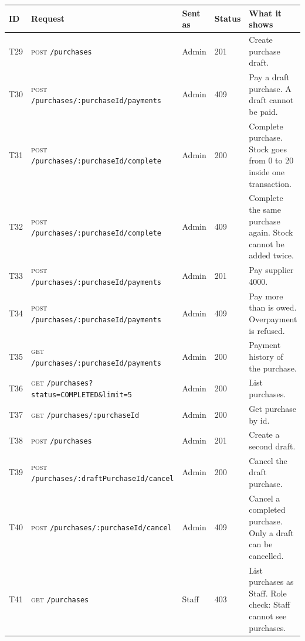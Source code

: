 \documentclass[11pt,a4paper]{article}
\newcommand{\code}[1]{\texttt{#1}}
\begin{document}
\begin{longtable}{@{}P{0.7cm}P{5.0cm}P{1.3cm}P{1.15cm}P{5.75cm}@{}}
\toprule
\textbf{ID} & \textbf{Request} & \textbf{Sent as} & \textbf{Status} & \textbf{What it shows} \\
\midrule
\endhead
T29 & \textsc{post} \code{/\allowbreak{}purchases} & Admin & 201 & Create purchase draft. \\
T30 & \textsc{post} \code{/\allowbreak{}purchases/\allowbreak{}:purchaseId/\allowbreak{}payments} & Admin & 409 & Pay a draft purchase. A draft cannot be paid. \\
T31 & \textsc{post} \code{/\allowbreak{}purchases/\allowbreak{}:purchaseId/\allowbreak{}complete} & Admin & 200 & Complete purchase. Stock goes from 0 to 20 inside one transaction. \\
T32 & \textsc{post} \code{/\allowbreak{}purchases/\allowbreak{}:purchaseId/\allowbreak{}complete} & Admin & 409 & Complete the same purchase again. Stock cannot be added twice. \\
T33 & \textsc{post} \code{/\allowbreak{}purchases/\allowbreak{}:purchaseId/\allowbreak{}payments} & Admin & 201 & Pay supplier 4000. \\
T34 & \textsc{post} \code{/\allowbreak{}purchases/\allowbreak{}:purchaseId/\allowbreak{}payments} & Admin & 409 & Pay more than is owed. Overpayment is refused. \\
T35 & \textsc{get} \code{/\allowbreak{}purchases/\allowbreak{}:purchaseId/\allowbreak{}payments} & Admin & 200 & Payment history of the purchase. \\
T36 & \textsc{get} \code{/\allowbreak{}purchases?\allowbreak{}status=\allowbreak{}COMPLETED\&\allowbreak{}limit=\allowbreak{}5} & Admin & 200 & List purchases. \\
T37 & \textsc{get} \code{/\allowbreak{}purchases/\allowbreak{}:purchaseId} & Admin & 200 & Get purchase by id. \\
T38 & \textsc{post} \code{/\allowbreak{}purchases} & Admin & 201 & Create a second draft. \\
T39 & \textsc{post} \code{/\allowbreak{}purchases/\allowbreak{}:draftPurchaseId/\allowbreak{}cancel} & Admin & 200 & Cancel the draft purchase. \\
T40 & \textsc{post} \code{/\allowbreak{}purchases/\allowbreak{}:purchaseId/\allowbreak{}cancel} & Admin & 409 & Cancel a completed purchase. Only a draft can be cancelled. \\
T41 & \textsc{get} \code{/\allowbreak{}purchases} & Staff & 403 & List purchases as Staff. Role check: Staff cannot see purchases. \\
\bottomrule
\end{longtable}
\end{document}
